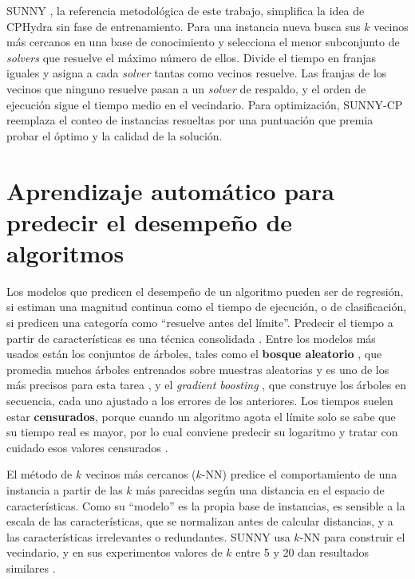SUNNY \citep{amadini2014sunny}, la referencia metodológica de este trabajo,
simplifica la idea de CPHydra sin fase de entrenamiento. Para una instancia
nueva busca sus $k$ vecinos más cercanos en una base de conocimiento y
selecciona el menor subconjunto de \textit{solvers} que resuelve el máximo
número de ellos. Divide el tiempo en franjas iguales y asigna a cada
\textit{solver} tantas como vecinos resuelve. Las franjas de los vecinos que
ninguno resuelve pasan a un \textit{solver} de respaldo, y el orden de
ejecución sigue el tiempo medio en el vecindario. Para optimización, SUNNY-CP
\citep{amadini2015sunnycp} reemplaza el conteo de instancias resueltas por una
puntuación que premia probar el óptimo y la calidad de la solución.

\section{Aprendizaje automático para predecir el desempeño de algoritmos}
\label{sec:ml}

Los modelos que predicen el desempeño de un algoritmo pueden ser de
regresión, si estiman una magnitud continua como el tiempo de ejecución, o de
clasificación, si predicen una categoría como ``resuelve antes del límite''.
Predecir el tiempo a partir de características es una técnica consolidada
\citep{hutter2014}. Entre los modelos más usados están los conjuntos de
árboles, tales como el \textbf{bosque aleatorio} \citep{breiman2001}, que
promedia muchos árboles entrenados sobre muestras aleatorias y es uno de los
más precisos para esta tarea \citep{hutter2014}, y el \textit{gradient
boosting} \citep{friedman2001}, que construye los árboles en secuencia, cada
uno ajustado a los errores de los anteriores. Los tiempos suelen estar
\textbf{censurados}, porque cuando un algoritmo agota el límite solo se sabe
que su tiempo real es mayor, por lo cual conviene predecir su logaritmo y
tratar con cuidado esos valores censurados \citep{hutter2014}.

El método de $k$ vecinos más cercanos ($k$-NN) \citep{cover1967} predice el
comportamiento de una instancia a partir de las $k$ más parecidas según una
distancia en el espacio de características. Como su ``modelo'' es la propia
base de instancias, es sensible a la escala de las características, que se
normalizan antes de calcular distancias, y a las características
irrelevantes o redundantes. SUNNY usa $k$-NN para construir el vecindario, y
en sus experimentos valores de $k$ entre 5 y 20 dan resultados similares
\citep{amadini2014sunny}.

